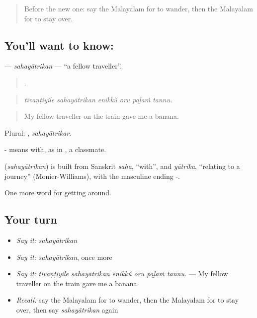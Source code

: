 \label{lesson:ML-C479-sahayatrikan}



\begin{quote}
Before the new one: say the Malayalam for to wander, then the Malayalam for to stay over.
\end{quote}

\subsection*{You'll want to know: }
\textbf{} — \emph{sahayātrikan} — \textquotedblleft{}a fellow traveller\textquotedblright{}.

\begin{quote}
     .
\end{quote}

\begin{quote}
\emph{tīvaṇṭiyile sahayātrikan enikkŭ oru paḻaṁ tannu.}
\end{quote}

\begin{quote}
My fellow traveller on the train gave me a banana.
\end{quote}

Plural: , \emph{sahayātrikar}.

- means with, as in , a classmate.

\begin{cousinweb}
\textbf{} (\emph{sahayātrikan}) is built from Sanskrit \emph{saha}, \textquotedblleft{}with\textquotedblright{}, and \emph{yātrika}, \textquotedblleft{}relating to a journey\textquotedblright{} (Monier-Williams), with the masculine ending -.
\end{cousinweb}

\begin{grammarlens}[title={What you've built}]
One more word for getting around.
\end{grammarlens}

\subsection*{Your turn}
\begin{itemize}
\raggedright
  \item \emph{Say it:} \emph{sahayātrikan}
  \item \emph{Say it:} \emph{sahayātrikan}, once more
  \item \emph{Say it:} \emph{tīvaṇṭiyile sahayātrikan enikkŭ oru paḻaṁ tannu.} — My fellow traveller on the train gave me a banana.
  \item \emph{Recall:} say the Malayalam for to wander, then the Malayalam for to stay over, then say \emph{sahayātrikan} again
\end{itemize}

